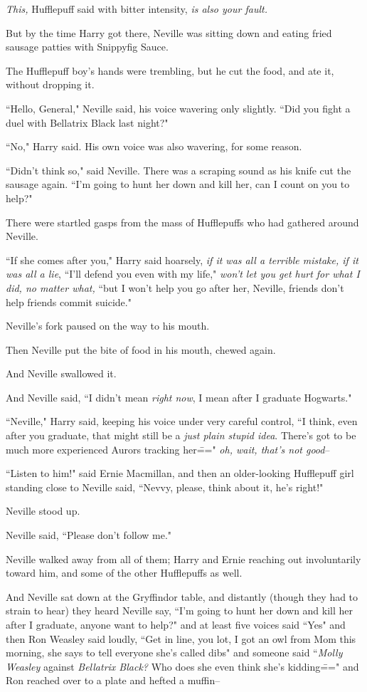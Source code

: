 \emph{This,} Hufflepuff said with bitter intensity, \emph{is also your fault.}

But by the time Harry got there, Neville was sitting down and eating fried sausage patties with Snippyfig Sauce.

The Hufflepuff boy's hands were trembling, but he cut the food, and ate it, without dropping it.

``Hello, General," Neville said, his voice wavering only slightly. ``Did you fight a duel with Bellatrix Black last night?"

``No," Harry said. His own voice was also wavering, for some reason.

``Didn't think so," said Neville. There was a scraping sound as his knife cut the sausage again. ``I'm going to hunt her down and kill her, can I count on you to help?"

There were startled gasps from the mass of Hufflepuffs who had gathered around Neville.

``If she comes after you," Harry said hoarsely, \emph{if it was all a terrible mistake, if it was all a lie}, ``I'll defend you even with my life," \emph{won't let you get hurt for what I did, no matter what,} ``but I won't help you go after her, Neville, friends don't help friends commit suicide."

Neville's fork paused on the way to his mouth.

Then Neville put the bite of food in his mouth, chewed again.

And Neville swallowed it.

And Neville said, ``I didn't mean \emph{right now}, I mean after I graduate Hogwarts."

``Neville," Harry said, keeping his voice under very careful control, ``I think, even after you graduate, that might still be a \emph{just plain stupid idea}. There's got to be much more experienced Aurors tracking her\===" \emph{oh, wait, that's not good}\---

``Listen to him!" said Ernie Macmillan, and then an older-looking Hufflepuff girl standing close to Neville said, ``Nevvy, please, think about it, he's right!"

Neville stood up.

Neville said, ``Please don't follow me."

Neville walked away from all of them; Harry and Ernie reaching out involuntarily toward him, and some of the other Hufflepuffs as well.

And Neville sat down at the Gryffindor table, and distantly (though they had to strain to hear) they heard Neville say, ``I'm going to hunt her down and kill her after I graduate, anyone want to help?" and at least five voices said ``Yes" and then Ron Weasley said loudly, ``Get in line, you lot, I got an owl from Mom this morning, she says to tell everyone she's called dibs" and someone said ``\emph{Molly Weasley} against \emph{Bellatrix Black?} Who does she even think she's kidding\===" and Ron reached over to a plate and hefted a muffin\---

